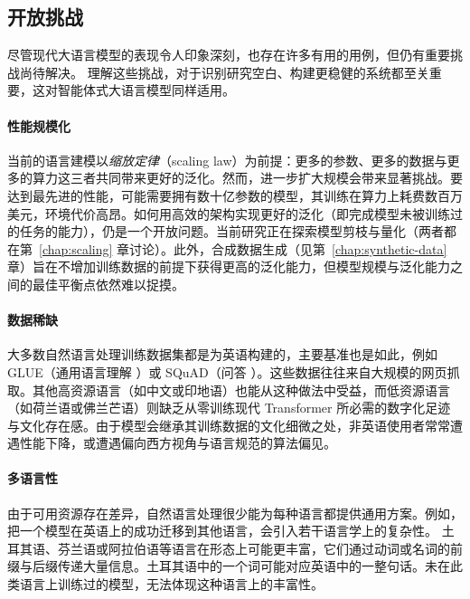 \subsection{开放挑战}
尽管现代大语言模型的表现令人印象深刻，也存在许多有用的用例，但仍有重要挑战尚待解决。 %
理解这些挑战，对于识别研究空白、构建更稳健的系统都至关重要，这对智能体式大语言模型同样适用。

\paragraph{性能规模化}
当前的语言建模以{\em 缩放定律}（scaling law）为前提：更多的参数、更多的数据与更多的算力这三者共同带来更好的泛化。然而，进一步扩大规模会带来显著挑战。要达到最先进的性能，可能需要拥有数十亿参数的模型，其训练在算力上耗费数百万美元，环境代价高昂。如何用高效的架构实现更好的泛化（即完成模型未被训练过的任务的能力），仍是一个开放问题。当前研究正在探索模型剪枝与量化（两者都在第~\ref{chap:scaling} 章讨论）。此外，合成数据生成（见第~\ref{chap:synthetic-data} 章）旨在不增加训练数据的前提下获得更高的泛化能力，但模型规模与泛化能力之间的最佳平衡点依然难以捉摸。

\paragraph{数据稀缺}
大多数自然语言处理训练数据集都是为英语构建的，主要基准也是如此，例如 GLUE（通用语言理解 \citep{wang2018glue}）或 SQuAD（问答 \citep{rajpurkar2016squad}）。这些数据往往来自大规模的网页抓取。其他高资源语言（如中文或印地语）也能从这种做法中受益，而低资源语言（如荷兰语或佛兰芒语）则缺乏从零训练现代 Transformer 所必需的数字化足迹与文化存在感。由于模型会继承其训练数据的文化细微之处，非英语使用者常常遭遇性能下降，或遭遇偏向西方视角与语言规范的算法偏见。

\paragraph{多语言性}
由于可用资源存在差异，自然语言处理很少能为每种语言都提供通用方案。例如，把一个模型在英语上的成功迁移到其他语言，会引入若干语言学上的复杂性。
土耳其语、芬兰语或阿拉伯语等语言在形态上可能更丰富，它们通过动词或名词的前缀与后缀传递大量信息。土耳其语中的一个词可能对应英语中的一整句话。未在此类语言上训练过的模型，无法体现这种语言上的丰富性。  

